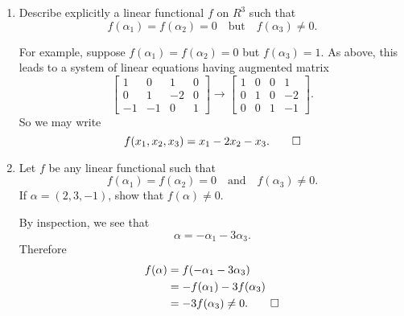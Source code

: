 \begin{enumerate}
\item Describe explicitly a linear functional $f$ on $R^3$ such that
  \begin{equation*}
    f(\alpha_1) = f(\alpha_2) = 0 \quad\text{but}\quad
    f(\alpha_3) \neq 0.
  \end{equation*}
  \begin{solution}
    For example, suppose $f(\alpha_1) = f(\alpha_2) = 0$ but
    $f(\alpha_3) = 1$. As above, this leads to a system of linear
    equations having augmented matrix
    \begin{equation*}
      \begin{bmatrix}
        1 & 0 & 1 & 0 \\
        0 & 1 & -2 & 0 \\
        -1 & -1 & 0 & 1
      \end{bmatrix}
      \rightarrow
      \begin{bmatrix}
        1 & 0 & 0 & 1 \\
        0 & 1 & 0 & -2 \\
        0 & 0 & 1 & -1
      \end{bmatrix}.
    \end{equation*}
    So we may write
    \begin{equation*}
      f(x_1,x_2,x_3) = x_1 - 2x_2 - x_3. \qedhere
    \end{equation*}
  \end{solution}

\item Let $f$ be any linear functional such that
  \begin{equation*}
    f(\alpha_1) = f(\alpha_2) = 0 \quad\text{and}\quad
    f(\alpha_3) \neq 0.
  \end{equation*}
  If $\alpha = (2, 3, -1)$, show that $f(\alpha)\neq0$.
  \begin{solution}
    By inspection, we see that
    \begin{equation*}
      \alpha = -\alpha_1 - 3\alpha_3.
    \end{equation*}
    Therefore
    \begin{align*}
      f(\alpha)
      &= f(-\alpha_1 - 3\alpha_3) \\
      &= -f(\alpha_1) - 3f(\alpha_3) \\
      &= -3f(\alpha_3) \neq 0. \qedhere
    \end{align*}
  \end{solution}
\end{enumerate}

